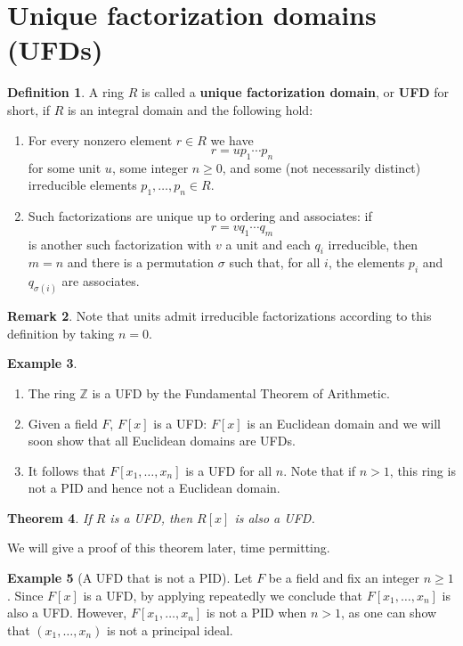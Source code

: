 \documentclass[12pt]{report}
\newtheorem{theorem}{Theorem}[chapter]
\numberwithin{equation}{section}
\numberwithin{theorem}{chapter}
\theoremstyle{definition}
\newtheorem{definition}[theorem]{Definition}
\newtheorem{example}[theorem]{Example}
\newtheorem*{basic properties}{Basic Properties}
\newtheorem*{Important Remark}{Important Remark}
\newtheorem{remark}[theorem]{Remark}
\newcommand{\df}[1]{{\bf #1}\index{#1}}
\newcommand{\Z}{\mathbb{Z}}
\begin{document}
\section{Unique factorization domains (UFDs)}


\begin{definition}
A ring $R$ is called a \df{unique factorization domain}, or \df{UFD} for short, if $R$ is an integral domain and the following hold:
\begin{enumerate}
\item  For every nonzero element $r \in R$  we have 
$$r = up_1 \cdots p_n$$
for some unit $u$, some integer $n \geqslant 0$, and some (not necessarily distinct) irreducible elements $p_1, \dots, p_n  \in R$.
\item Such factorizations are unique up to ordering and associates: if
$$r = vq_1 \cdots q_m$$
is another such factorization with $v$ a unit and each $q_i$ irreducible, then $m = n$ and there is a permutation $\sigma$ such that, for all $i$, the elements $p_i$ and $q_{\sigma(i)}$ are associates.
\end{enumerate}
\end{definition}


\begin{remark} 
Note that units admit irreducible factorizations according to this definition by taking $n = 0$.
\end{remark}


\begin{example}
\begin{enumerate}
\item The ring $\Z$ is a UFD by the Fundamental Theorem of Arithmetic.
\item Given a field $F$, $F[x]$ is a UFD: $F[x]$ is an Euclidean domain and we will soon show that all Euclidean domains are UFDs.
\item It follows that $F[x_1, \dots, x_n]$ is a UFD for all $n$. Note that if $n > 1$, this ring is not a PID and hence not a Euclidean domain.
\end{enumerate}
\end{example}


\begin{theorem}\label{R ufd => R[x] ufd}
	If $R$ is a UFD, then $R[x]$ is also a UFD.
\end{theorem}

We will give a proof of this theorem later, time permitting.


\begin{example}[A UFD that is not a PID]
Let $F$ be a field and fix an integer $n \geqslant 1$. Since $F[x]$ is a UFD, by applying  repeatedly we conclude that $F[x_1, \dots, x_n]$ is also a UFD. However, $F[x_1, \ldots, x_n]$ is not a PID when $n>1$, as one can show that $(x_1, \ldots, x_n)$ is not a principal ideal.
\end{example}
\end{document}
